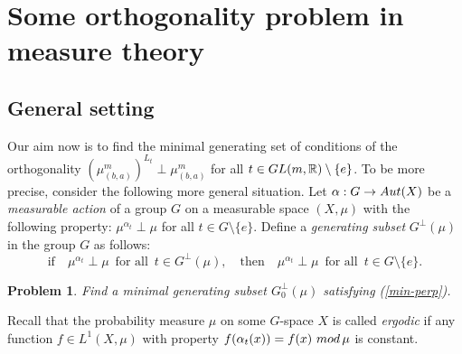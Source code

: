 \documentclass[preprint,12pt]{elsarticle}
\newtheorem{prb}[thm]{Problem}
\numberwithin{equation}{section}
\begin{document}
\section{Some orthogonality problem in  measure theory}
\label{sec.orth.m=3}
\subsection{General setting}
Our aim now is to find the minimal generating set of conditions of the orthogonality
$(\mu^m_{(b,a)})^{L_{t}}\!\perp\! \mu^m_{(b,a)}$ for all
$t\in {\rm GL}(m,{\mathbb R})\setminus\{e\}$. To be more precise, consider the following more general situation.
%
Let $\alpha:G\rightarrow {\rm
Aut}(X)$  be a {\it measurable action} of a group $G$  on a
measurable space $(X,%
\mu)$ with the following property:
 $\mu^{\alpha_t}\perp\mu$ for all $t\in G\setminus\{e\}$. 
Define a {\it generating subset} $G^\perp(\mu)$ in the group $G$ 
as follows:
%
\begin{equation}
\label{min-perp}
\text{if}\quad \mu^{\alpha_t}\perp\mu\,\,\,\text{for all}\,\,\, t\in G^\perp(\mu),
\quad\text{then}\quad \mu^{\alpha_t}\perp\mu\,\,\,\text{for all}\,\,\,
t\in G\setminus\{e\}.
\end{equation}
\begin{prb}
\label{pr.min-perp}
Find a {\rm minimal generating subset} $G^\perp_0(\mu)$ 
satisfying {\rm (\ref{min-perp})}.
\end{prb}
\begin{df}
\label{d.erg}
Recall that the probability measure $\mu$ on some $G$-space $X$ is called {\it ergodic} if any function
$f\in L^1(X,\mu)$ with property $f(\alpha_t(x))=f(x)\,\,{\rm mod}\,\mu$ is constant.
\end{df}
\end{document}
